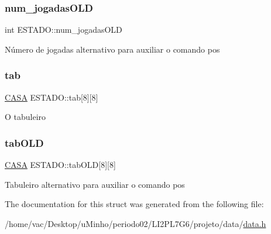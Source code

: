 \subsubsection{\texorpdfstring{num\+\_\+jogadas\+O\+LD}{num\_jogadasOLD}}
{\footnotesize\ttfamily int E\+S\+T\+A\+D\+O\+::num\+\_\+jogadas\+O\+LD}

Número de jogadas alternativo para auxiliar o comando pos \mbox{\label{structESTADO_ab56f0f1be16954d3768b4174d14c087d}} 
\subsubsection{\texorpdfstring{tab}{tab}}
{\footnotesize\ttfamily \hyperlink{data_8h_aba91601f16d4c485b2d9b8c429f27039}{C\+A\+SA} E\+S\+T\+A\+D\+O\+::tab\mbox{[}8\mbox{]}\mbox{[}8\mbox{]}}

O tabuleiro \mbox{\label{structESTADO_a66bbe063098bbfc016ee8a21672e2bbd}} 
\subsubsection{\texorpdfstring{tab\+O\+LD}{tabOLD}}
{\footnotesize\ttfamily \hyperlink{data_8h_aba91601f16d4c485b2d9b8c429f27039}{C\+A\+SA} E\+S\+T\+A\+D\+O\+::tab\+O\+LD\mbox{[}8\mbox{]}\mbox{[}8\mbox{]}}

Tabuleiro alternativo para auxiliar o comando pos 

The documentation for this struct was generated from the following file\+:\begin{DoxyCompactItemize}
\item 
/home/vac/\+Desktop/u\+Minho/periodo02/\+L\+I2\+P\+L7\+G6/projeto/data/\hyperlink{data_8h}{data.\+h}\end{DoxyCompactItemize}
